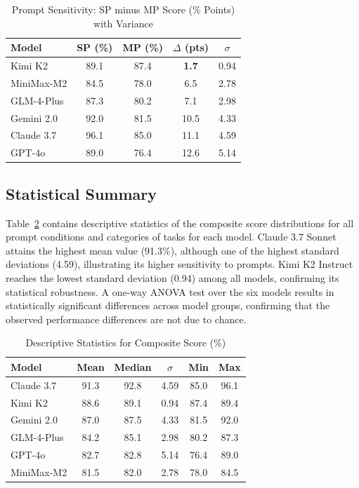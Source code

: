 \documentclass[conference]{IEEEtran}
\begin{document}
\begin{table}[H]
\centering
\caption{Prompt Sensitivity: SP minus MP Score (\% Points) with Variance}
\label{tab:sensitivity}
\renewcommand{\arraystretch}{1.3}
\begin{tabular}{lcccc}
\toprule
\textbf{Model} & \textbf{SP (\%)} & \textbf{MP (\%)} & \textbf{$\Delta$ (pts)} & \textbf{$\sigma$} \\
\midrule
Kimi K2     & 89.1 & 87.4 & \textbf{1.7}  & 0.94 \\
MiniMax-M2  & 84.5 & 78.0 & 6.5           & 2.78 \\
GLM-4-Plus  & 87.3 & 80.2 & 7.1           & 2.98 \\
Gemini 2.0  & 92.0 & 81.5 & 10.5          & 4.33 \\
Claude 3.7  & 96.1 & 85.0 & 11.1          & 4.59 \\
GPT-4o      & 89.0 & 76.4 & 12.6          & 5.14 \\
\bottomrule
\end{tabular}
\end{table}

\subsection{Statistical Summary}

Table~\ref{tab:stats} contains descriptive statistics of the composite score distributions for all prompt conditions and categories of tasks for each model. Claude 3.7 Sonnet attains the highest mean value (91.3\%), although one of the highest standard deviations (4.59), illustrating its higher sensitivity to prompts. Kimi K2 Instruct reaches the lowest standard deviation (0.94) among all models, confirming its statistical robustness. A one-way ANOVA test over the six models results in statistically significant differences across model groups, confirming that the observed performance differences are not due to chance.

\begin{table}[H]
\centering
\caption{Descriptive Statistics for Composite Score (\%)}
\label{tab:stats}
\renewcommand{\arraystretch}{1.3}
\begin{tabular}{lccccc}
\toprule
\textbf{Model} & \textbf{Mean} & \textbf{Median} & \textbf{$\sigma$} & \textbf{Min} & \textbf{Max} \\
\midrule
Claude 3.7  & 91.3 & 92.8 & 4.59 & 85.0 & 96.1 \\
Kimi K2     & 88.6 & 89.1 & 0.94 & 87.4 & 89.4 \\
Gemini 2.0  & 87.0 & 87.5 & 4.33 & 81.5 & 92.0 \\
GLM-4-Plus  & 84.2 & 85.1 & 2.98 & 80.2 & 87.3 \\
GPT-4o      & 82.7 & 82.8 & 5.14 & 76.4 & 89.0 \\
MiniMax-M2  & 81.5 & 82.0 & 2.78 & 78.0 & 84.5 \\
\bottomrule
\end{tabular}
\end{table}
\end{document}
